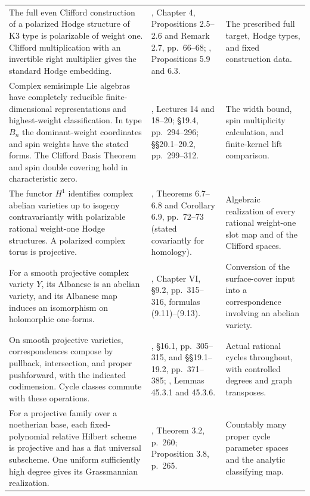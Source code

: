 \begin{longtable}{@{}>{\raggedright\arraybackslash}p{}>{\raggedright\arraybackslash}p{}>{\raggedright\arraybackslash}p{}@{}}
The full even Clifford construction of a polarized Hodge structure of K3
type is polarizable of weight one.  Clifford multiplication with an
invertible right multiplier gives the standard Hodge embedding. &
\cite{Huybrechts}, Chapter 4, Propositions 2.5--2.6 and Remark 2.7,
pp.~66--68;
\cite{vanGeemen}, Propositions 5.9 and 6.3. &
The prescribed full target, Hodge types, and fixed construction data. \\[3pt]

Complex semisimple Lie algebras have completely reducible finite-dimensional
representations and highest-weight classification.  In type $B_n$ the
dominant-weight coordinates and spin weights have the stated forms.
The Clifford Basis Theorem and spin double covering hold in characteristic
zero. &
\cite{FultonHarris}, Lectures 14 and 18--20;
\S19.4, pp.~294--296;
\S\S20.1--20.2, pp.~299--312. &
The width bound, spin multiplicity calculation, and finite-kernel lift
comparison. \\[3pt]

The functor $H^1$ identifies complex abelian varieties up to isogeny
contravariantly with polarizable rational weight-one Hodge structures.
A polarized complex torus is projective. &
\cite{Milne}, Theorems 6.7--6.8 and Corollary 6.9,
pp.~72--73 (stated covariantly for homology). &
Algebraic realization of every rational weight-one slot map and of the
Clifford spaces. \\[3pt]

For a smooth projective complex variety $Y$, its Albanese is an abelian
variety, and its Albanese map induces an isomorphism on holomorphic
one-forms. &
\cite{Albanese}, Chapter VI, \S9.2, pp.~315--316,
formulas (9.11)--(9.13). &
Conversion of the surface-cover input into a correspondence involving an
abelian variety. \\[3pt]

On smooth projective varieties, correspondences compose by
pullback, intersection, and proper pushforward, with the indicated
codimension.  Cycle classes commute with these operations. &
\cite{Fulton}, \S16.1, pp.~305--315, and
\S\S19.1--19.2, pp.~371--385;
\cite{StacksCorrespondences}, Lemmas 45.3.1 and 45.3.6. &
Actual rational cycles throughout, with controlled degrees and graph
transposes. \\[3pt]

For a projective family over a noetherian base, each fixed-polynomial
relative Hilbert scheme is projective and has a flat universal
subscheme.  One uniform sufficiently high degree gives its Grassmannian
realization. &
\cite{GrothendieckHilbert}, Theorem 3.2, p.~260;
Proposition 3.8, p.~265. &
Countably many proper cycle parameter spaces and the analytic
classifying map. \\[3pt]


\end{longtable}
